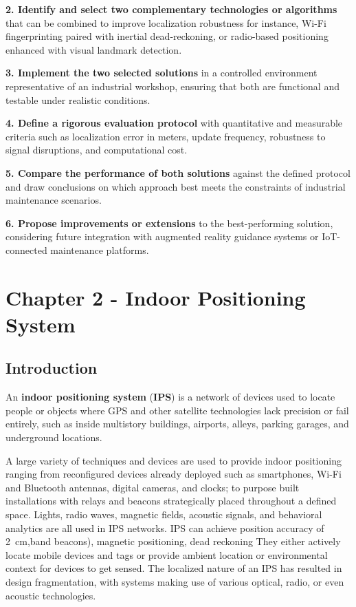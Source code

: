 \documentclass{ipgpmaster}
\begin{document}
\textbf{2. Identify and select two complementary technologies or algorithms} that can be combined to improve localization robustness for instance, Wi-Fi fingerprinting paired with inertial dead-reckoning, or radio-based positioning enhanced with visual landmark detection.

\textbf{3. Implement the two selected solutions} in a controlled environment representative of an industrial workshop, ensuring that both are functional and testable under realistic conditions.

\textbf{4. Define a rigorous evaluation protocol} with quantitative and measurable criteria such as localization error in meters, update frequency, robustness to signal disruptions, and computational cost.

\textbf{5. Compare the performance of both solutions} against the defined protocol and draw conclusions on which approach best meets the constraints of industrial maintenance scenarios.

\textbf{6. Propose improvements or extensions} to the best-performing solution, considering future integration with augmented reality guidance systems or IoT-connected maintenance platforms.

 


\section{Chapter 2 - Indoor Positioning System }


\subsection{Introduction}
An \textbf{indoor positioning system} (\textbf{IPS}) is a network of devices used to locate people or objects where GPS and other satellite technologies lack precision or fail entirely, such as inside multistory buildings, airports, alleys, parking garages, and underground locations.

A large variety of techniques and devices are used to provide indoor positioning ranging from reconfigured devices already deployed such as smartphones, Wi-Fi and Bluetooth antennas, digital cameras, and clocks; to purpose built installations with relays and beacons strategically placed throughout a defined space. Lights, radio waves, magnetic fields, acoustic signals, and behavioral analytics are all used in IPS networks. IPS can achieve position accuracy of 2 cm,band beacons), magnetic positioning, dead reckoning They either actively locate mobile devices and tags or provide ambient location or environmental context for devices to get sensed. The localized nature of an IPS has resulted in design fragmentation, with systems making use of various optical, radio, or even acoustic technologies.
\end{document}
